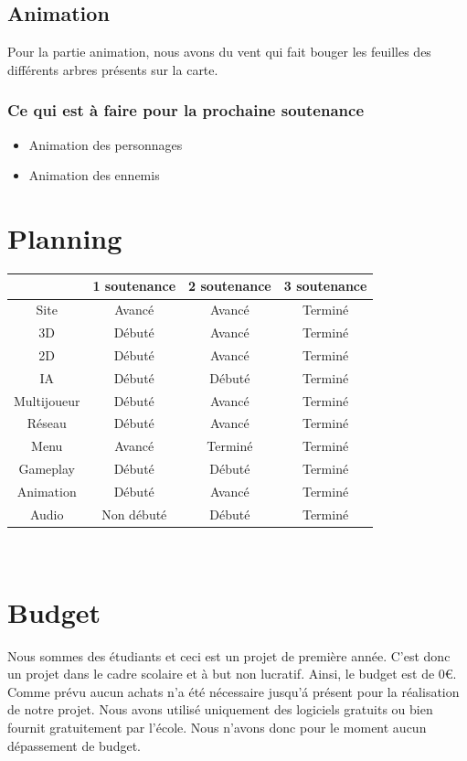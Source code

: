 \documentclass[a4paper, 12pt]{article}
\begin{document}
	\subsection{Animation}
	Pour la partie animation, nous avons du vent qui fait bouger les feuilles des différents arbres présents sur la carte.

\subsubsection*{Ce qui est à faire pour la prochaine soutenance}
\begin{itemize}
\item Animation des personnages
\item Animation des ennemis
\end{itemize}

\section{Planning}
	\begin{tabular}{|c||c|c|c|}
		\hline
		& 1\iere{} soutenance & 2\ieme{} soutenance & 3\ieme{} soutenance \\
		\hline
		Site &  Avancé & Avancé & Terminé \\
		\hline
		3D & Débuté & Avancé & Terminé \\
		\hline
		2D & Débuté & Avancé & Terminé \\
		\hline
		IA & Débuté & Débuté & Terminé\\
		\hline
		Multijoueur & Débuté & Avancé & Terminé\\
		\hline
		Réseau & Débuté & Avancé & Terminé\\
		\hline
		Menu & Avancé & Terminé & Terminé \\
		\hline
		Gameplay & Débuté & Débuté & Terminé\\
		\hline
		Animation & Débuté & Avancé & Terminé\\		
		\hline
		Audio & Non débuté & Débuté & Terminé\\
		\hline		
	\end{tabular}\\
	\newpage
\section{Budget}

Nous sommes des étudiants et ceci est un projet de première année. C'est donc un projet dans le cadre scolaire et à but non lucratif. Ainsi, le budget est de 0\euro{}. Comme prévu aucun achats n'a été nécessaire jusqu'\'a présent pour la réalisation de notre projet. Nous avons utilisé uniquement des logiciels gratuits ou bien fournit gratuitement par l'école. Nous n'avons donc pour le moment aucun dépassement de budget.\\
\end{document}
